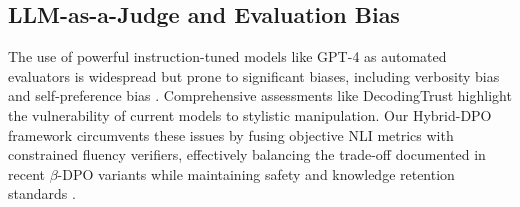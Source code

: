 \subsection{LLM-as-a-Judge and Evaluation Bias}
The use of powerful instruction-tuned models like GPT-4 as automated evaluators \cite{zheng2024judging} is widespread but prone to significant biases, including verbosity bias \cite{wang2023large} and self-preference bias \cite{pan2024evalbias}. Comprehensive assessments like DecodingTrust \cite{wang2023trust} highlight the vulnerability of current models to stylistic manipulation. Our Hybrid-DPO framework circumvents these issues by fusing objective NLI metrics with constrained fluency verifiers, effectively balancing the trade-off documented in recent $\beta$-DPO variants \cite{park2024betadpo} while maintaining safety and knowledge retention standards \cite{kim2025safety}.
